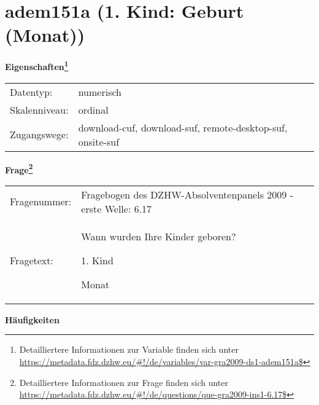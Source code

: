 
    \setcounter{footnote}{0}

    \vspace*{-1.8cm}
	\section{adem151a (1. Kind: Geburt (Monat))}
	\label{section:adem151a}



    \vspace*{0.5cm}
    \noindent\textbf{Eigenschaften\footnote{Detailliertere Informationen zur Variable finden sich unter
		\url{https://metadata.fdz.dzhw.eu/\#!/de/variables/var-gra2009-ds1-adem151a$}}}\\
	\begin{tabularx}{\hsize}{@{}lX}
	Datentyp: & numerisch \\
	Skalenniveau: & ordinal \\
	Zugangswege: &
	  download-cuf, 
	  download-suf, 
	  remote-desktop-suf, 
	  onsite-suf
 \\
    \end{tabularx}



				\vspace*{0.5cm}
                \noindent\textbf{Frage\footnote{Detailliertere Informationen zur Frage finden sich unter
		              \url{https://metadata.fdz.dzhw.eu/\#!/de/questions/que-gra2009-ins1-6.17$}}}\\
				\begin{tabularx}{\hsize}{@{}lX}
					Fragenummer: &
					  Fragebogen des DZHW-Absolventenpanels 2009 - erste Welle:
					  6.17
 \\
					Fragetext: & Wann wurden Ihre Kinder geboren?\par  1. Kind\par  Monat \\
				\end{tabularx}





        		\vspace*{0.5cm}
                \noindent\textbf{Häufigkeiten}

